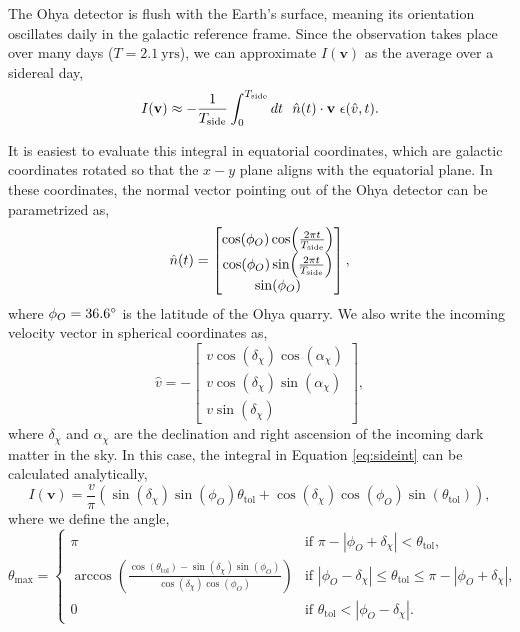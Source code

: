 \documentclass[12pt]{article}
\begin{document}
The Ohya detector is flush with the Earth's surface, meaning its orientation oscillates daily in the galactic reference frame. Since the observation takes place over many days ($T=2.1\ \mathrm{ yrs}$), we can approximate $I(\mathbf{v})$ as the average over a sidereal day,
\begin{equation}\label{eq:sideint}
    I(\mathbf{v})\approx -\frac{1}{T_{\rm side}}\int_0^{T_{\rm side}} dt \ \ \hat{n}(t) \cdot \mathbf{v}\ \epsilon(\hat{v},t ) .
\end{equation}

It is easiest to evaluate this integral in equatorial coordinates, which are galactic coordinates rotated so that the $x-y$ plane aligns with the equatorial plane. In these coordinates, the normal vector pointing out of the Ohya detector can be parametrized as, 
\begin{equation}
    \hat{n}(t)=\begin{bmatrix}
        \cos(\phi_O)\cos(\frac{2\pi t}{T_{\rm side}})\\
        \cos(\phi_O)\sin(\frac{2\pi t}{T_{\rm side}})\\
        \sin(\phi_O)
    \end{bmatrix},
\end{equation}
where $\phi_O=36.6 \degree$ is the latitude of the Ohya quarry.
We also write the incoming velocity vector in spherical coordinates as, 
\begin{equation}
    \hat{v}=-\begin{bmatrix}
        v\cos(\delta_\chi)\cos(\alpha_\chi)\\
        v\cos(\delta_\chi)\sin(\alpha_\chi)\\
        v\sin(\delta_\chi)
    \end{bmatrix},
\end{equation}
where $\delta_\chi$ and $\alpha_\chi$ are the declination and right ascension of the incoming dark matter in the sky.
In this case, the integral in Equation \ref{eq:sideint}  can be calculated analytically, 
\begin{equation}
    I(\mathbf{v})=\frac{v}{\pi}(\sin(\delta_\chi)\sin(\phi_O)\theta_{\mathrm{tol}}+\cos(\delta_\chi)\cos(\phi_O)\sin(\theta_{\mathrm{tol}})),
\end{equation}
where we define the angle,
\begin{equation}\label{eq:groundFlux}
    \theta_{\mathrm{max}} = \begin{cases}
\pi & \text{if } \pi - |\phi_O+\delta_\chi|<\theta_{\mathrm{tol}}, \\
\arccos\left(\frac{\cos(\theta_{\mathrm{tol}})-\sin(\delta_\chi)\sin(\phi_O)}{\cos(\delta_\chi)\cos(\phi_O)}\right) & \text{if } |\phi_O-\delta_\chi|\leq \theta_{\mathrm{tol}} \leq\pi - |\phi_O+\delta_\chi|, \\
0 & \text{if } \theta_{\mathrm{tol}}<|\phi_O-\delta_\chi|.
\end{cases}
\end{equation}
\end{document}
